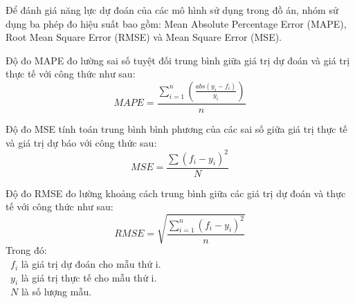 Để đánh giá năng lực dự đoán của các mô hình sử dụng trong đồ án, nhóm sử dụng ba phép đo hiệu suất bao gồm: Mean Absolute Percentage Error (MAPE), Root Mean Square Error (RMSE) và Mean Square Error (MSE).

Độ đo MAPE đo lường sai số tuyệt đối trung bình giữa giá trị dự đoán và giá trị thực tế với công thức như sau:
\[
MAPE = \frac{\sum_{i=1}^{n}\left(\frac{abs(y_i - f_i)}{y_i}\right)}{n}
\]

Độ đo MSE tính toán trung bình bình phương của các sai số giữa giá trị thực tế và giá trị dự báo với công thức sau:
\[
MSE = \frac{\sum(f_i - y_i)^2}{N}
\]

Độ đo RMSE đo lường khoảng cách trung bình giữa các giá trị dự đoán và thực tế với công thức như sau:
\[
RMSE = \sqrt{\frac{\sum_{i=1}^{n}(f_i - y_i)^2}{n}}
\]
Trong đó:\\
    \indent\textbullet\ \(f_{i}\) là giá trị dự đoán cho mẫu thứ i.\\
    \indent\textbullet\ \(y_{i}\) là giá trị thực tế cho mẫu thứ i.\\
    \indent\textbullet\ \(N\) là số lượng mẫu.
